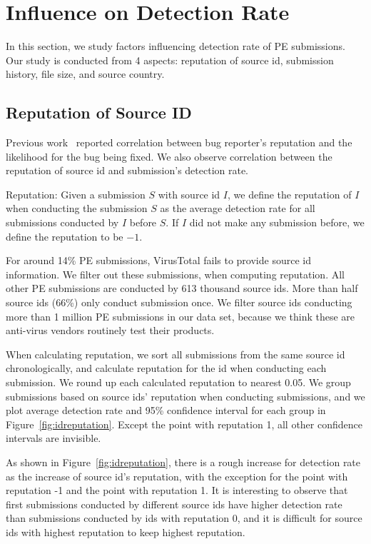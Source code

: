 \section{Influence on Detection Rate}
\label{sec:corr}
In this section, we study factors influencing detection rate of PE submissions. 
Our study is conducted from 4 aspects: reputation of source id, submission history, 
file size, and source country.



\subsection{Reputation of Source ID}

\label{sec:reputation}

Previous work~\cite{GuoICSE2010} reported correlation between bug reporter’s reputation and the likelihood for the bug being fixed. 
We also observe correlation between the reputation of source id and submission’s detection rate. 

\begin{definition}{Reputation:}
Given a submission $S$ with source id $I$, 
we define the reputation of $I$ when conducting the submission $S$ as the average detection rate for all submissions conducted by $I$ before $S$. 
If $I$ did not make any submission before, we define the reputation to be $-1$. 
\end{definition}

For around 14\% PE submissions, VirusTotal fails to provide source id information. 
We filter out these submissions, when computing reputation.
All other PE submissions are conducted by 613 thousand source ids. 
More than half source ids (66\%) only conduct submission once. 
We filter source ids conducting more than 1 million PE submissions in our data set, 
because we think these are anti-virus vendors routinely test their products. 

When calculating reputation, we sort all submissions from the same source id chronologically, 
and calculate reputation for the id when conducting each submission. 
We round up each calculated reputation to nearest 0.05. 
We group submissions based on source ids' reputation when conducting submissions, 
and we plot average detection rate and 95\% confidence interval for each group in Figure~\ref{fig:idreputation}. 
Except the point with reputation 1, all other confidence intervals are invisible.  

As shown in Figure~\ref{fig:idreputation}, 
there is a rough increase for detection rate as the increase of source id's reputation, 
with the exception for the point with reputation -1 and the point with reputation 1. 
It is interesting to observe that first submissions conducted by different source ids have higher 
detection rate than submissions conducted by ids with reputation 0, 
and it is difficult for source ids with highest reputation to keep highest reputation.  

